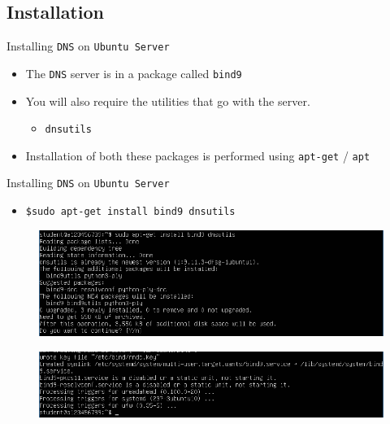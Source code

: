 \documentclass{beamer}
\begin{document}
\subsection{Installation}
\begin{frame}{Installing \texttt{DNS} on \texttt{Ubuntu Server}}
  \begin{itemize}
    \item The \texttt{DNS} server is in a package called \texttt{bind9}
    \item You will also require the utilities that go with the server.
      \begin{itemize}
        \item \texttt{dnsutils}
      \end{itemize} 
    \item Installation of both these packages is performed using \texttt{apt-get} / \texttt{apt}
  \end{itemize}
\end{frame}

\begin{frame}{Installing \texttt{DNS} on \texttt{Ubuntu Server}}
  \begin{itemize}
    \item \texttt{\$sudo apt-get install bind9 dnsutils}
  \end{itemize}
  \begin{figure}
    \begin{center}
      \includegraphics[width=0.9\linewidth]{bind9-1.png}
    \end{center}
  \end{figure}
  \begin{figure}
    \begin{center}
      \includegraphics[width=0.9\linewidth]{bind9-2.png}
    \end{center}
  \end{figure}
\end{frame}
\end{document}
